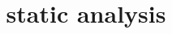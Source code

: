 \graphicspath{{./figures/}}
\title{static analysis}
\date{}

\begin{frame}
    \titlepage
\end{frame}






